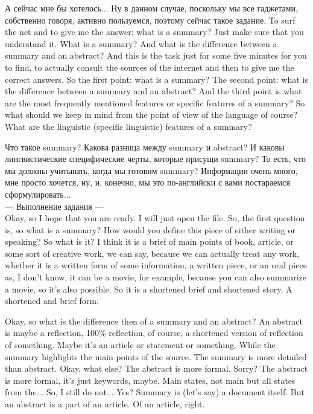 \documentclass[main.tex]{subfiles}
\begin{document}
А сейчас мне бы хотелось...
Ну в данном случае, поскольку мы все гаджетами, собственно говоря, активно пользуемся, поэтому сейчас такое задание.
To surf the net and to give me the answer: what is a summary?
Just make sure that you understand it.
What is a summary?
And what is the difference between a summary and an abstract?
And this is the task just for some five minutes for you to find, to actually consult the sources of the internet and then to give me the correct answers.
So the first point: what is a summary?
The second point: what is the difference between a summary and an abstract?
And the third point is what are the most frequently mentioned features or specific features of a summary?
So what should we keep in mind from the point of view of the language of course?
What are the linguistic (specific linguistic) features of a summary?

Что такое summary?
Какова разница между summary и abstract?
И каковы лингвистические специфические черты, которые присущи summary?
То есть, что мы должны учитывать, когда мы готовим summary?
Информации очень много, мне просто хочется, ну, и, конечно, мы это по-английски с вами постараемся сформулировать...
\\

--- Выполнение задания ---
\\

Okay, so I hope that you are ready.
I will just open the file.
So, the first question is, so what is a summary?
How would you define this piece of either writing or speaking?
So what is it?
I think it is a brief of main points of book, article, or some sort of creative work, we can say, because we can actually treat any work, whether it is a written form of some information, a written piece, or an oral piece as, I don't know, it can be a movie, for example, because you can also summarize a movie, so it's also possible.
So it is a shortened brief and shortened story.
A shortened and brief form.

Okay, so what is the difference then of a summary and an abstract?
An abstract is maybe a reflection, 100\% reflection, of course, a shortened version of reflection of something.
Maybe it's an article or statement or something.
While the summary highlights the main points of the source.
The summary is more detailed than abstract.
Okay, what else?
The abstract is more formal.
Sorry?
The abstract is more formal, it's just keywords, maybe.
Main states, not main but all states from the...
So, I still do not...
Yes?
Summary is (let's say) a document itself.
But an abstract is a part of an article.
Of an article, right.
\end{document}
